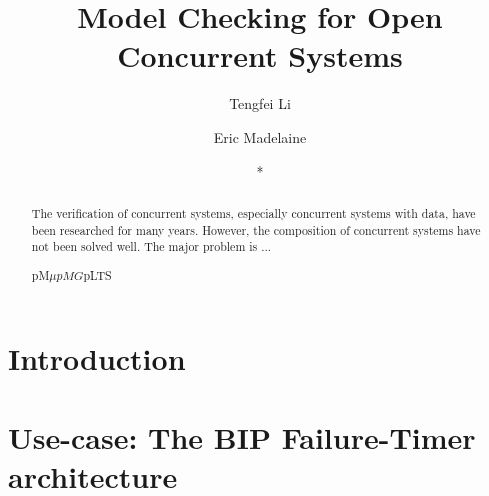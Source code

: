 \documentclass[runningheads,a4paper]{llncs}
\newcommand{\keywords}[1]{\par\addvspace\baselineskip
\noindent\keywordname\enspace\ignorespaces#1}
\begin{document}
\mainmatter  %

\title{Model Checking for Open Concurrent Systems}


%
%
\author{Tengfei Li
\and Eric Madelaine \and *
}
%



\institute{
}

%
%

\maketitle


\begin{abstract}

The verification of concurrent systems, especially concurrent systems with data, have been researched for many years. However, the composition of concurrent systems have not been solved well. The major problem is ...

\keywords{ pM$\mu$\quad $pMG $\quad pLTS }
\end{abstract}


\section{Introduction}

\section{Use-case: The BIP Failure-Timer architecture}
\end{document}
